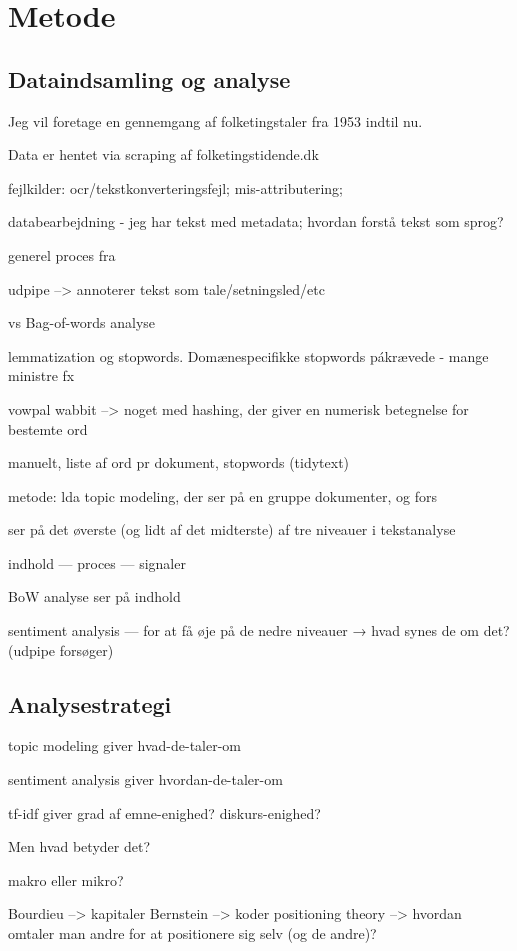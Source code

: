 \section{Metode}

\subsection{Dataindsamling og analyse}

Jeg vil foretage en gennemgang af folketingstaler fra 1953 indtil nu.

Data er hentet via scraping af folketingstidende.dk \autocite{pedersenFolketinget2019}

fejlkilder: ocr/tekstkonverteringsfejl; mis-attributering;

databearbejdning - jeg har tekst med metadata; hvordan forstå tekst som sprog?

generel proces fra \autocite{kwartlerTextMiningPractice2017}



udpipe -->  annoterer tekst som tale/setningsled/etc

vs Bag-of-words analyse

lemmatization og stopwords.
Domænespecifikke stopwords pákrævede - mange ministre fx

vowpal wabbit --> noget med hashing, der giver en numerisk betegnelse for bestemte ord

manuelt, liste af ord pr dokument, stopwords (tidytext)

metode: lda topic modeling, der ser på en gruppe dokumenter, og fors

ser på det øverste (og lidt af det midterste) af tre niveauer i tekstanalyse \autocite{evansMachineTranslationMining2016}

indhold — proces — signaler 

BoW analyse ser på indhold

sentiment analysis — for at få øje på de nedre niveauer
→ hvad synes de om det? (udpipe forsøger)

\subsection{Analysestrategi}

topic modeling giver hvad-de-taler-om

sentiment analysis giver hvordan-de-taler-om

tf-idf giver grad af emne-enighed? diskurs-enighed?

Men hvad betyder det?

makro eller mikro?

Bourdieu --> kapitaler
Bernstein --> koder
positioning theory --> hvordan omtaler man andre for at positionere sig selv (og de andre)?
